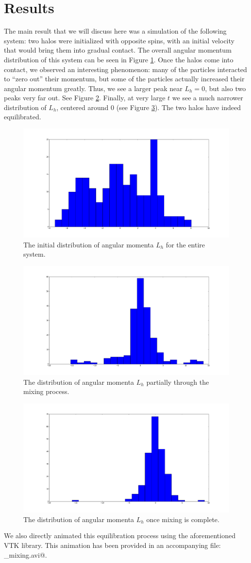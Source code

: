 \documentclass[12pt]{article}
\begin{document}
\section{Results}
The main result that we will discuss here was a simulation of the following
system: two halos were initialized with opposite spins, with an initial
velocity that would bring them into gradual contact. The overall angular
momentum distribution of this system can be seen in Figure \ref{fig:init_dist}.
Once the halos come into contact, we observed an interesting phenomenon: many
of the particles interacted to ``zero out'' their momentum, but some of the
particles actually increased their angular momentum greatly. Thus, we see
a larger peak near $L_h = 0$, but also two peaks very far out. See Figure
\ref{fig:mid_dist}.  Finally, at very large $t$ we see a much narrower
distribution of $L_h$, centered around $0$ (see Figure \ref{fig:final_dist}).
The two halos have indeed equilibrated.

\begin{figure}[htp]
\centering
\includegraphics[width=0.5\columnwidth]{../figures/zerosum_mixing_initial_distribution.png}
\caption{The initial distribution of angular momenta $L_h$ for the entire system.}
\label{fig:init_dist}
\end{figure}

\begin{figure}[htp]
\centering
\includegraphics[width=0.5\columnwidth]{../figures/zerosum_mixing_midway_distribution.png}
\caption{The distribution of angular momenta $L_h$ partially through the mixing process.}
\label{fig:mid_dist}
\end{figure}

\begin{figure}[htp]
\centering
\includegraphics[width=0.5\columnwidth]{../figures/zerosum_mixing_final_distribution.png}
\caption{The distribution of angular momenta $L_h$ once mixing is complete.}
\label{fig:final_dist}
\end{figure}

We also directly animated this equilibration process using the aforementioned
VTK library. This animation has been provided in an accompanying file:
\verb@zerosum_mixing.avi@.



\end{document}
